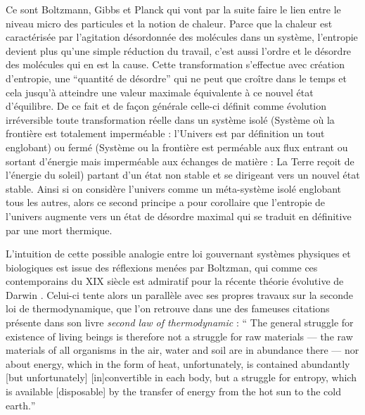Ce sont Boltzmann, Gibbs et Planck qui vont par la suite faire le lien entre le niveau micro des particules et la notion de chaleur. Parce que la chaleur est caractérisée par l'agitation désordonnée des molécules dans un système, l'entropie devient plus qu'une simple réduction du travail, c'est aussi l'ordre et le désordre des molécules qui en est la cause. Cette transformation s'effectue avec création d'entropie, une \enquote{quantité de désordre} qui ne peut que croître dans le temps et cela jusqu'à atteindre une valeur maximale équivalente à ce nouvel état d'équilibre. De ce fait et de façon générale celle-ci définit comme évolution irréversible toute transformation réelle dans un système isolé (Système où la frontière est totalement imperméable : l'Univers est par définition un tout englobant) ou fermé (Système ou la frontière est perméable aux flux entrant ou sortant d'énergie mais imperméable aux échanges de matière : La Terre reçoit de l'énergie du soleil) partant d'un état non stable et se dirigeant vers un nouvel état stable. Ainsi si on considère l'univers comme un méta-système isolé englobant tous les autres, alors ce second principe a pour corollaire que l'entropie de l'univers augmente vers un état de désordre maximal qui se traduit en définitive par une mort thermique.

L'intuition de cette possible analogie entre loi gouvernant systèmes physiques et biologiques est issue des réflexions menées par Boltzman, qui comme ces contemporains du XIX siècle est admiratif pour la récente théorie évolutive de Darwin \autocite[27]{Prigogine1996}. Celui-ci tente alors un parallèle avec ses propres travaux sur la seconde loi de thermodynamique, que l'on retrouve dans une des fameuses citations présente dans son livre \textit{second law of thermodynamic} : \foreignquote{english}{ The general struggle for existence of living beings is therefore not a struggle for raw materials — the raw materials of all organisms in the air, water and soil are in abundance there — nor about energy, which in the form of heat, unfortunately, is contained abundantly [but unfortunately] [in]convertible in each body, but a struggle for entropy, which is available [disposable] by the transfer of energy from the hot sun to the cold earth.}


